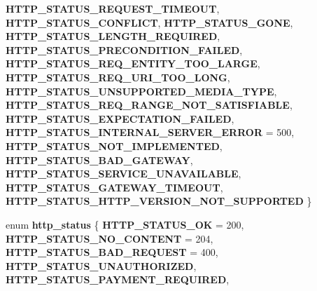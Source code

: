 \begin{DoxyCompactItemize}
\newline
{\bfseries H\+T\+T\+P\+\_\+\+S\+T\+A\+T\+U\+S\+\_\+\+R\+E\+Q\+U\+E\+S\+T\+\_\+\+T\+I\+M\+E\+O\+UT}, 
{\bfseries H\+T\+T\+P\+\_\+\+S\+T\+A\+T\+U\+S\+\_\+\+C\+O\+N\+F\+L\+I\+CT}, 
{\bfseries H\+T\+T\+P\+\_\+\+S\+T\+A\+T\+U\+S\+\_\+\+G\+O\+NE}, 
{\bfseries H\+T\+T\+P\+\_\+\+S\+T\+A\+T\+U\+S\+\_\+\+L\+E\+N\+G\+T\+H\+\_\+\+R\+E\+Q\+U\+I\+R\+ED}, 
\newline
{\bfseries H\+T\+T\+P\+\_\+\+S\+T\+A\+T\+U\+S\+\_\+\+P\+R\+E\+C\+O\+N\+D\+I\+T\+I\+O\+N\+\_\+\+F\+A\+I\+L\+ED}, 
{\bfseries H\+T\+T\+P\+\_\+\+S\+T\+A\+T\+U\+S\+\_\+\+R\+E\+Q\+\_\+\+E\+N\+T\+I\+T\+Y\+\_\+\+T\+O\+O\+\_\+\+L\+A\+R\+GE}, 
{\bfseries H\+T\+T\+P\+\_\+\+S\+T\+A\+T\+U\+S\+\_\+\+R\+E\+Q\+\_\+\+U\+R\+I\+\_\+\+T\+O\+O\+\_\+\+L\+O\+NG}, 
{\bfseries H\+T\+T\+P\+\_\+\+S\+T\+A\+T\+U\+S\+\_\+\+U\+N\+S\+U\+P\+P\+O\+R\+T\+E\+D\+\_\+\+M\+E\+D\+I\+A\+\_\+\+T\+Y\+PE}, 
\newline
{\bfseries H\+T\+T\+P\+\_\+\+S\+T\+A\+T\+U\+S\+\_\+\+R\+E\+Q\+\_\+\+R\+A\+N\+G\+E\+\_\+\+N\+O\+T\+\_\+\+S\+A\+T\+I\+S\+F\+I\+A\+B\+LE}, 
{\bfseries H\+T\+T\+P\+\_\+\+S\+T\+A\+T\+U\+S\+\_\+\+E\+X\+P\+E\+C\+T\+A\+T\+I\+O\+N\+\_\+\+F\+A\+I\+L\+ED}, 
{\bfseries H\+T\+T\+P\+\_\+\+S\+T\+A\+T\+U\+S\+\_\+\+I\+N\+T\+E\+R\+N\+A\+L\+\_\+\+S\+E\+R\+V\+E\+R\+\_\+\+E\+R\+R\+OR} = 500, 
{\bfseries H\+T\+T\+P\+\_\+\+S\+T\+A\+T\+U\+S\+\_\+\+N\+O\+T\+\_\+\+I\+M\+P\+L\+E\+M\+E\+N\+T\+ED}, 
\newline
{\bfseries H\+T\+T\+P\+\_\+\+S\+T\+A\+T\+U\+S\+\_\+\+B\+A\+D\+\_\+\+G\+A\+T\+E\+W\+AY}, 
{\bfseries H\+T\+T\+P\+\_\+\+S\+T\+A\+T\+U\+S\+\_\+\+S\+E\+R\+V\+I\+C\+E\+\_\+\+U\+N\+A\+V\+A\+I\+L\+A\+B\+LE}, 
{\bfseries H\+T\+T\+P\+\_\+\+S\+T\+A\+T\+U\+S\+\_\+\+G\+A\+T\+E\+W\+A\+Y\+\_\+\+T\+I\+M\+E\+O\+UT}, 
{\bfseries H\+T\+T\+P\+\_\+\+S\+T\+A\+T\+U\+S\+\_\+\+H\+T\+T\+P\+\_\+\+V\+E\+R\+S\+I\+O\+N\+\_\+\+N\+O\+T\+\_\+\+S\+U\+P\+P\+O\+R\+T\+ED}
 \}
\item 
\mbox{\label{group__http_gabc3b93f68c8bdd857ad32913628dfa8d}} 
enum {\bfseries http\+\_\+status} \{ \newline
{\bfseries H\+T\+T\+P\+\_\+\+S\+T\+A\+T\+U\+S\+\_\+\+OK} = 200, 
{\bfseries H\+T\+T\+P\+\_\+\+S\+T\+A\+T\+U\+S\+\_\+\+N\+O\+\_\+\+C\+O\+N\+T\+E\+NT} = 204, 
{\bfseries H\+T\+T\+P\+\_\+\+S\+T\+A\+T\+U\+S\+\_\+\+B\+A\+D\+\_\+\+R\+E\+Q\+U\+E\+ST} = 400, 
{\bfseries H\+T\+T\+P\+\_\+\+S\+T\+A\+T\+U\+S\+\_\+\+U\+N\+A\+U\+T\+H\+O\+R\+I\+Z\+ED}, 
\newline
{\bfseries H\+T\+T\+P\+\_\+\+S\+T\+A\+T\+U\+S\+\_\+\+P\+A\+Y\+M\+E\+N\+T\+\_\+\+R\+E\+Q\+U\+I\+R\+ED}, 

\end{DoxyCompactItemize}
